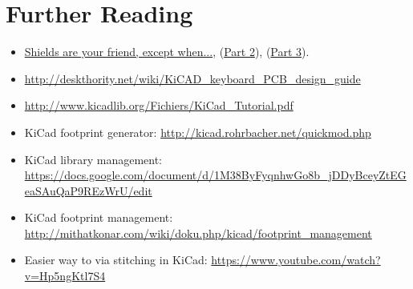 \documentclass[12pt,letterpaper]{scrartcl}
\begin{document}
\newpage
\section{Further Reading}

\begin{itemize}
	\item \href{http://www.edn.com/electronics-blogs/the-practicing-instrumentation-engineer/4418080/2/Shields-are-your-friend--except-when-}{Shields are your friend, except when...}, (\href{http://www.edn.com/electronics-blogs/the-practicing-instrumentation-engineer/4419228/2/Shields-are-your-friend--except-when---Part-2-}{Part 2}), (\href{}{Part 3}).
	\item \url{http://deskthority.net/wiki/KiCAD_keyboard_PCB_design_guide}

	\item \url{http://www.kicadlib.org/Fichiers/KiCad_Tutorial.pdf}

	\item KiCad footprint generator: \url{http://kicad.rohrbacher.net/quickmod.php}

	\item KiCad library management: \url{https://docs.google.com/document/d/1M38ByFyqnhwGo8b_jDDyBceyZtEGeaSAuQaP9REzWrU/edit}

	\item KiCad footprint management:
\url{http://mithatkonar.com/wiki/doku.php/kicad/footprint_management}

	\item Easier way to via stitching in KiCad: \url{https://www.youtube.com/watch?v=Hp5ngKtl7S4}
\end{itemize}


\newpage



\end{document}
